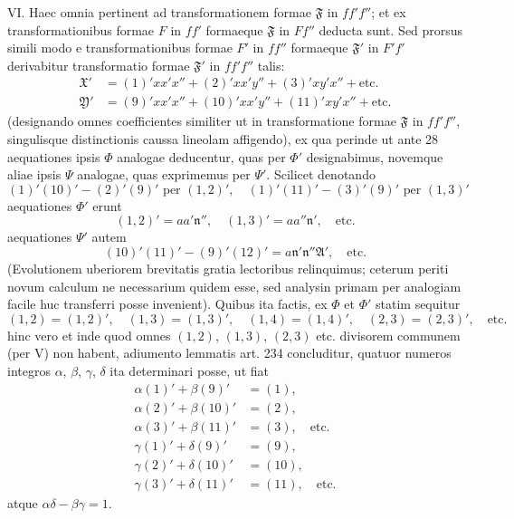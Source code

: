 VI. Haec omnia pertinent ad transformationem formae $\mathfrak{F}$ in $ff'f''$; et ex transformationibus formae $F$ in $ff'$ formaeque $\mathfrak{F}$ in $Ff''$ deducta sunt. Sed prorsus simili modo e transformationibus formae $F'$ in $ff''$ formaeque $\mathfrak{F}'$ in $F'f'$ derivabitur transformatio formae $\mathfrak{F}'$ in $ff'f''$ talis:
\[
\begin{aligned}
\mathfrak{X}'&=(1)'xx'x''+(2)'xx'y''+(3)'xy'x''+\text{etc.}\\
\mathfrak{Y}'&=(9)'xx'x''+(10)'xx'y''+(11)'xy'x''+\text{etc.}
\end{aligned}
\]
(designando omnes coefficientes similiter ut in transformatione formae $\mathfrak{F}$ in $ff'f''$, singulisque distinctionis caussa lineolam affigendo), ex qua perinde ut ante 28 aequationes ipsis $\Phi$ analogae deducentur, quas per $\Phi'$ designabimus, novemque aliae ipsis $\Psi$ analogae, quas exprimemus per $\Psi'$. Scilicet denotando
\[
(1)'(10)'-(2)'(9)'\text{ per }(1,2)',\quad
(1)'(11)'-(3)'(9)'\text{ per }(1,3)'
\]
aequationes $\Phi'$ erunt
\[
(1,2)'=aa'\mathfrak{n}'',\quad (1,3)'=aa''\mathfrak{n}',\quad\text{etc.}
\]
aequationes $\Psi'$ autem
\[
(10)'(11)'-(9)'(12)'=a\mathfrak{n}'\mathfrak{n}''\mathfrak{A}',\quad\text{etc.}
\]
(Evolutionem uberiorem brevitatis gratia lectoribus relinquimus; ceterum periti novum calculum ne necessarium quidem esse, sed analysin primam per analogiam facile huc transferri posse invenient). Quibus ita factis, ex $\Phi$ et $\Phi'$ statim sequitur
\[
(1,2)=(1,2)',\quad (1,3)=(1,3)',\quad (1,4)=(1,4)',\quad (2,3)=(2,3)',\quad\text{etc.}
\]
hinc vero et inde quod omnes $(1,2)$, $(1,3)$, $(2,3)$ etc. divisorem communem (per V) non habent, adiumento lemmatis art. 234 concluditur, quatuor numeros integros $\alpha$, $\beta$, $\gamma$, $\delta$ ita determinari posse, ut fiat
\[
\begin{aligned}
\alpha(1)'+\beta(9)'&=(1),\\\alpha(2)'+\beta(10)'&=(2),\\\alpha(3)'+\beta(11)'&=(3),\quad\text{etc.}\\
\gamma(1)'+\delta(9)'&=(9),\\\gamma(2)'+\delta(10)'&=(10),\\\gamma(3)'+\delta(11)'&=(11),\quad\text{etc.}
\end{aligned}
\]
atque $\alpha\delta-\beta\gamma=1$.

